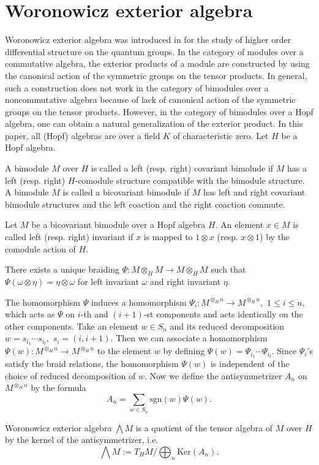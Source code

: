 \section{Woronowicz exterior algebra}
Woronowicz exterior algebra was introduced in \cite{Wo} 
for the study of higher order differential structure on the 
quantum groups. In the category of modules over a commutative 
algebra, the exterior products of a module are constructed 
by using the canonical action of the symmetric groups 
on the tensor products. In general, such a construction 
does not work in the category of bimodules over a noncommutative 
algebra because of lack of canonical action of the symmetric 
groups on the tensor products.  However, in the category 
of bimodules over a Hopf algebra, one can obtain a natural 
generalization of the exterior product. In this paper, all 
(Hopf) algebras are over a field $K$ of characteristic zero. 
Let $H$ be a Hopf algebra. 
\begin{dfn}
A bimodule $M$ over $H$ is called a left (resp. right) covariant 
bimolude if $M$ has a left (resp. right) $H$-comodule structure 
compatible with the bimodule structure. A bimodule $M$ is called 
a bicovariant bimodule if $M$ has left and right covariant 
bimodule structures and the left coaction and the right coaction 
commute. 
\end{dfn}
\begin{dfn} 
Let $M$ be a bicovariant bimodule over a Hopf algebra $H.$ 
An element $x\in M$ is called left (resp. right) invariant 
if $x$ is mapped to 
$1 \otimes x$ (resp. $x\otimes 1$) by the comodule 
action of $H.$  
\end{dfn}
\begin{lem}
There exists a unique braiding $\Psi : M \otimes_H M 
\rightarrow M \otimes _H M$ such that 
$\Psi(\omega \otimes \eta)=\eta \otimes \omega$ for 
left invariant $\omega$ and right invariant $\eta.$ 
\end{lem}
The homomorphism $\Psi$ induces a homomorphism 
$\Psi_i : M^{\otimes_H n} \rightarrow M^{\otimes_H n},$ 
$1\leq i \leq n,$ which acts as $\Psi$ on $i$-th and 
$(i+1)$-st components and acts identically on the other 
components. Take an element $w\in S_n$ and its reduced 
decomposition $w=s_{i_1}\cdots s_{i_l},$ $s_i= (i,i+1).$ 
Then we can associate a homomorphism 
$\Psi(w) : M^{\otimes_H n} \rightarrow M^{\otimes_H n}$ 
to the element $w$ by defining $\Psi(w)= \Psi_{i_1}\cdots 
\Psi_{i_l}.$ Since $\Psi_i$'s satisfy the braid relations, 
the homomorphism $\Psi(w)$ is independent of the choice of 
reduced decomposition of $w.$ 
Now we define the antisymmetrizer $A_n$ on $M^{\otimes_H n}$ 
by the formula 
\[ A_n = \sum_{w\in S_n} \textrm{sgn}(w) \Psi(w). \]  
\begin{dfn}
Woronowicz exterior algebra $\bigwedge M$ 
is a quotient of the tensor 
algebra of $M$ over $H$ by the kernel of the antisymmetrizer, 
i.e. {\rm 
\[ \bigwedge M := T_H M / \bigoplus_n \textrm{Ker} (A_n). \]} 
\end{dfn}
